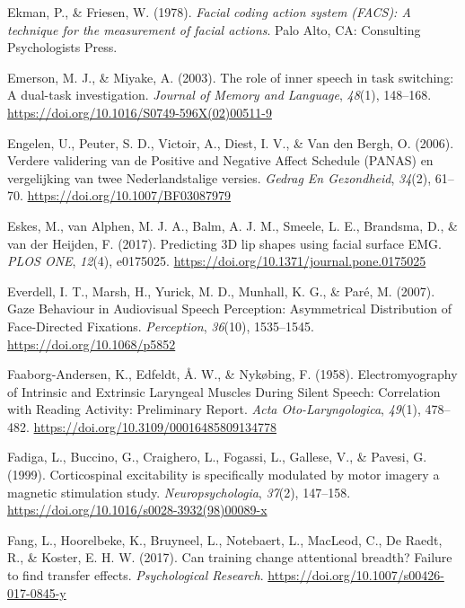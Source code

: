 \documentclass[a4paper,12pt,twoside,openright,oldfontcommands,final]{memoir}
\begin{document}
\leavevmode\hypertarget{ref-ekman_facial_1978}{}%
Ekman, P., \& Friesen, W. (1978). \emph{Facial coding action system (FACS): A technique for the measurement of facial actions}. Palo Alto, CA: Consulting Psychologists Press.

\leavevmode\hypertarget{ref-emerson_role_2003}{}%
Emerson, M. J., \& Miyake, A. (2003). The role of inner speech in task switching: A dual-task investigation. \emph{Journal of Memory and Language}, \emph{48}(1), 148--168. \url{https://doi.org/10.1016/S0749-596X(02)00511-9}

\leavevmode\hypertarget{ref-engelen_verdere_2006}{}%
Engelen, U., Peuter, S. D., Victoir, A., Diest, I. V., \& Van den Bergh, O. (2006). Verdere validering van de Positive and Negative Affect Schedule (PANAS) en vergelijking van twee Nederlandstalige versies. \emph{Gedrag En Gezondheid}, \emph{34}(2), 61--70. \url{https://doi.org/10.1007/BF03087979}

\leavevmode\hypertarget{ref-eskes_predicting_2017}{}%
Eskes, M., van Alphen, M. J. A., Balm, A. J. M., Smeele, L. E., Brandsma, D., \& van der Heijden, F. (2017). Predicting 3D lip shapes using facial surface EMG. \emph{PLOS ONE}, \emph{12}(4), e0175025. \url{https://doi.org/10.1371/journal.pone.0175025}

\leavevmode\hypertarget{ref-everdell_gaze_2007}{}%
Everdell, I. T., Marsh, H., Yurick, M. D., Munhall, K. G., \& Paré, M. (2007). Gaze Behaviour in Audiovisual Speech Perception: Asymmetrical Distribution of Face-Directed Fixations. \emph{Perception}, \emph{36}(10), 1535--1545. \url{https://doi.org/10.1068/p5852}

\leavevmode\hypertarget{ref-faaborg-andersen_electromyography_1958}{}%
Faaborg-Andersen, K., Edfeldt, Å. W., \& Nykøbing, F. (1958). Electromyography of Intrinsic and Extrinsic Laryngeal Muscles During Silent Speech: Correlation with Reading Activity: Preliminary Report. \emph{Acta Oto-Laryngologica}, \emph{49}(1), 478--482. \url{https://doi.org/10.3109/00016485809134778}

\leavevmode\hypertarget{ref-fadiga_corticospinal_1999}{}%
Fadiga, L., Buccino, G., Craighero, L., Fogassi, L., Gallese, V., \& Pavesi, G. (1999). Corticospinal excitability is specifically modulated by motor imagery a magnetic stimulation study. \emph{Neuropsychologia}, \emph{37}(2), 147--158. \url{https://doi.org/10.1016/s0028-3932(98)00089-x}

\leavevmode\hypertarget{ref-fang_can_2017}{}%
Fang, L., Hoorelbeke, K., Bruyneel, L., Notebaert, L., MacLeod, C., De Raedt, R., \& Koster, E. H. W. (2017). Can training change attentional breadth? Failure to find transfer effects. \emph{Psychological Research}. \url{https://doi.org/10.1007/s00426-017-0845-y}
\end{document}

